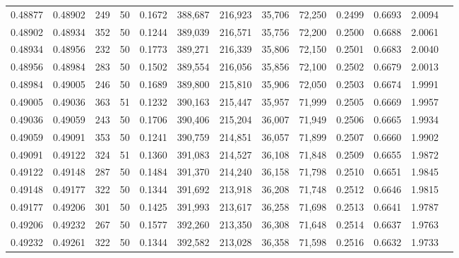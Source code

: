 \begin{tabular}{rrrrrrrrrrrrr}
0.48877 & 0.48902 &   249 &  50 &                                     0.1672 & 388,687 & 216,923 &  35,706 &  72,250 & 0.2499 & 0.6693 & 2.0094 \\
0.48902 & 0.48934 &   352 &  50 &                                     0.1244 & 389,039 & 216,571 &  35,756 &  72,200 & 0.2500 & 0.6688 & 2.0061 \\
0.48934 & 0.48956 &   232 &  50 &                                     0.1773 & 389,271 & 216,339 &  35,806 &  72,150 & 0.2501 & 0.6683 & 2.0040 \\
0.48956 & 0.48984 &   283 &  50 &                                     0.1502 & 389,554 & 216,056 &  35,856 &  72,100 & 0.2502 & 0.6679 & 2.0013 \\
0.48984 & 0.49005 &   246 &  50 &                                     0.1689 & 389,800 & 215,810 &  35,906 &  72,050 & 0.2503 & 0.6674 & 1.9991 \\
0.49005 & 0.49036 &   363 &  51 &                                     0.1232 & 390,163 & 215,447 &  35,957 &  71,999 & 0.2505 & 0.6669 & 1.9957 \\
0.49036 & 0.49059 &   243 &  50 &                                     0.1706 & 390,406 & 215,204 &  36,007 &  71,949 & 0.2506 & 0.6665 & 1.9934 \\
0.49059 & 0.49091 &   353 &  50 &                                     0.1241 & 390,759 & 214,851 &  36,057 &  71,899 & 0.2507 & 0.6660 & 1.9902 \\
0.49091 & 0.49122 &   324 &  51 &                                     0.1360 & 391,083 & 214,527 &  36,108 &  71,848 & 0.2509 & 0.6655 & 1.9872 \\
0.49122 & 0.49148 &   287 &  50 &                                     0.1484 & 391,370 & 214,240 &  36,158 &  71,798 & 0.2510 & 0.6651 & 1.9845 \\
0.49148 & 0.49177 &   322 &  50 &                                     0.1344 & 391,692 & 213,918 &  36,208 &  71,748 & 0.2512 & 0.6646 & 1.9815 \\
0.49177 & 0.49206 &   301 &  50 &                                     0.1425 & 391,993 & 213,617 &  36,258 &  71,698 & 0.2513 & 0.6641 & 1.9787 \\
0.49206 & 0.49232 &   267 &  50 &                                     0.1577 & 392,260 & 213,350 &  36,308 &  71,648 & 0.2514 & 0.6637 & 1.9763 \\
0.49232 & 0.49261 &   322 &  50 &                                     0.1344 & 392,582 & 213,028 &  36,358 &  71,598 & 0.2516 & 0.6632 & 1.9733 \\

\end{tabular}

